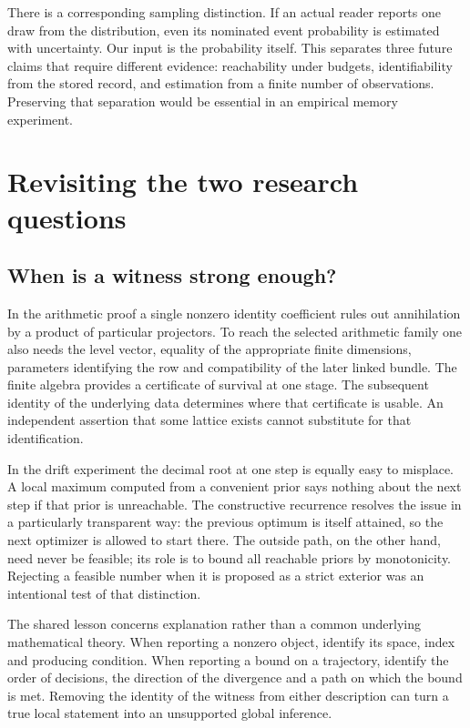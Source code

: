 \documentclass[12pt,letterpaper]{article}
\begin{document}
There is a corresponding sampling distinction. If an actual reader reports one draw from the distribution, even its nominated event probability is estimated with uncertainty. Our input is the probability itself. This separates three future claims that require different evidence: reachability under budgets, identifiability from the stored record, and estimation from a finite number of observations. Preserving that separation would be essential in an empirical memory experiment.

\section{Revisiting the two research questions}
\subsection{When is a witness strong enough?}
In the arithmetic proof a single nonzero identity coefficient rules out annihilation by a product of particular projectors. To reach the selected arithmetic family one also needs the level vector, equality of the appropriate finite dimensions, parameters identifying the row and compatibility of the later linked bundle. The finite algebra provides a certificate of survival at one stage. The subsequent identity of the underlying data determines where that certificate is usable. An independent assertion that some lattice exists cannot substitute for that identification.

In the drift experiment the decimal root at one step is equally easy to misplace. A local maximum computed from a convenient prior says nothing about the next step if that prior is unreachable. The constructive recurrence resolves the issue in a particularly transparent way: the previous optimum is itself attained, so the next optimizer is allowed to start there. The outside path, on the other hand, need never be feasible; its role is to bound all reachable priors by monotonicity. Rejecting a feasible number when it is proposed as a strict exterior was an intentional test of that distinction.

The shared lesson concerns explanation rather than a common underlying mathematical theory. When reporting a nonzero object, identify its space, index and producing condition. When reporting a bound on a trajectory, identify the order of decisions, the direction of the divergence and a path on which the bound is met. Removing the identity of the witness from either description can turn a true local statement into an unsupported global inference.
\end{document}
